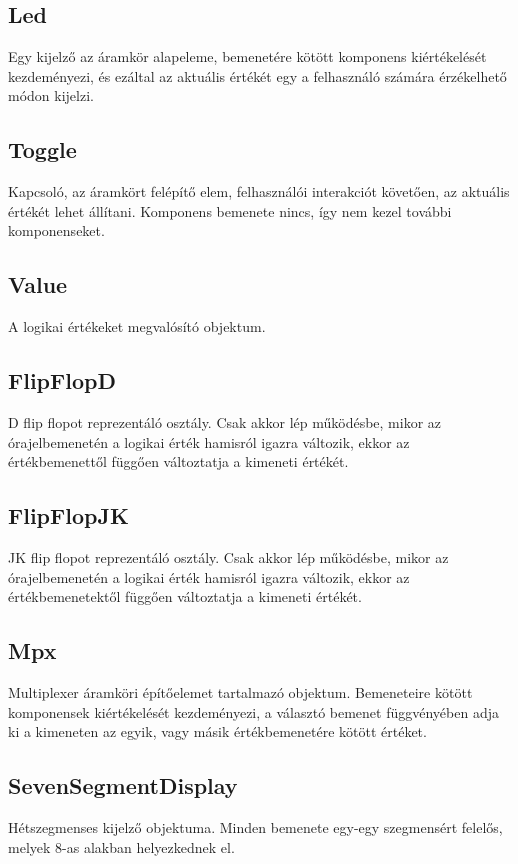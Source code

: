 \subsection{\bf Led}
Egy kijelző az áramkör alapeleme, bemenetére kötött komponens kiértékelését kezdeményezi, és ezáltal az aktuális értékét egy a felhasználó számára érzékelhető módon kijelzi.

\subsection{\bf Toggle}
Kapcsoló, az áramkört felépítő elem, felhasználói interakciót követően, az aktuális értékét lehet állítani. Komponens bemenete nincs, így nem kezel további komponenseket.

\subsection{\bf Value}
A logikai értékeket megvalósító objektum.

\subsection{\bf FlipFlopD}
D flip flopot reprezentáló osztály. Csak akkor lép működésbe, mikor az órajelbemenetén a logikai érték hamisról igazra változik, ekkor az értékbemenettől függően változtatja a kimeneti értékét.

\subsection{\bf FlipFlopJK}
JK flip flopot reprezentáló osztály. Csak akkor lép működésbe, mikor az órajelbemenetén a logikai érték hamisról igazra változik, ekkor az értékbemenetektől függően változtatja a kimeneti értékét.

\subsection{\bf Mpx}
Multiplexer áramköri építőelemet tartalmazó objektum. Bemeneteire kötött komponensek kiértékelését kezdeményezi, a választó bemenet függvényében adja ki a kimeneten az egyik, vagy másik értékbemenetére kötött értéket.

\subsection{\bf SevenSegmentDisplay}
Hétszegmenses kijelző objektuma. Minden bemenete egy-egy szegmensért felelős, melyek 8-as alakban helyezkednek el.

